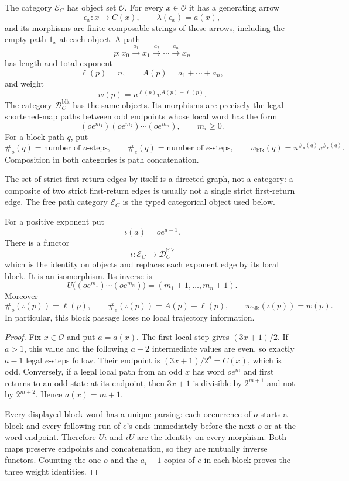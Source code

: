 \begin{definition}
\label{def:odd-first-return-path-category}
The category $\mathcal E_C$ has object set $\mathcal O$.  For every
$x\in\mathcal O$ it has a generating arrow
\[
 \epsilon_x:x\longrightarrow C(x),
 \qquad \lambda(\epsilon_x)=a(x),
\]
and its morphisms are finite composable strings of these arrows, including
the empty path $1_x$ at each object.  A path
\[
 p:x_0\xrightarrow{a_1}x_1\xrightarrow{a_2}\cdots
       \xrightarrow{a_n}x_n
\]
has length and total exponent
\[
 \ell(p)=n,
 \qquad A(p)=a_1+\cdots+a_n,
\]
and weight
\[
 w(p)=u^{\ell(p)}v^{A(p)-\ell(p)}.
\]
The category $\mathcal D_C^{\mathrm{blk}}$ has the same objects.  Its
morphisms are precisely the legal shortened-map paths between odd endpoints
whose local word has the form
\[
 (oe^{m_1})(oe^{m_2})\cdots(oe^{m_n}),
 \qquad m_i\geq0.
\]
For a block path $q$, put
\[
 \#_o(q)=\text{number of $o$-steps},
 \qquad
 \#_e(q)=\text{number of $e$-steps},
 \qquad
 w_{\mathrm{blk}}(q)=u^{\#_o(q)}v^{\#_e(q)}.
\]
Composition in both categories is path concatenation.
\end{definition}

The set of strict first-return edges by itself is a directed graph, not a
category: a composite of two strict first-return edges is usually not a
single strict first-return edge.  The free path category $\mathcal E_C$ is the
typed categorical object used below.

\begin{theorem}
\label{thm:chatnotes-block-category-isomorphism}
For a positive exponent put
\[
 \iota(a)=oe^{a-1}.
\]
There is a functor
\[
 \iota:\mathcal E_C\longrightarrow\mathcal D_C^{\mathrm{blk}}
\]
which is the identity on objects and replaces each exponent edge by its local
block.  It is an isomorphism.  Its inverse is
\[
 U\bigl((oe^{m_1})\cdots(oe^{m_n})\bigr)
   =(m_1+1,\ldots,m_n+1).
\]
Moreover
\[
 \#_o(\iota(p))=\ell(p),
 \qquad
 \#_e(\iota(p))=A(p)-\ell(p),
 \qquad
 w_{\mathrm{blk}}(\iota(p))=w(p).
\]
In particular, this block passage loses no local trajectory information.
\end{theorem}

\begin{proof}
Fix $x\in\mathcal O$ and put $a=a(x)$.  The first local step gives
$(3x+1)/2$.  If $a>1$, this value and the following $a-2$ intermediate
values are even, so exactly $a-1$ legal $e$-steps follow.  Their endpoint is
$(3x+1)/2^a=C(x)$, which is odd.  Conversely, if a legal local path from an
odd $x$ has word $oe^m$ and first returns to an odd state at its endpoint,
then $3x+1$ is divisible by $2^{m+1}$ and not by $2^{m+2}$.  Hence
$a(x)=m+1$.

Every displayed block word has a unique parsing: each occurrence of $o$
starts a block and every following run of $e$'s ends immediately before the
next $o$ or at the word endpoint.  Therefore $U\iota$ and $\iota U$ are the
identity on every morphism.  Both maps preserve endpoints and concatenation,
so they are mutually inverse functors.  Counting the one $o$ and the $a_i-1$
copies of $e$ in each block proves the three weight identities.
\end{proof}

